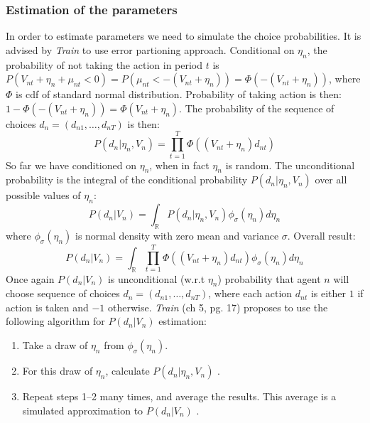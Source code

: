 \documentclass[11pt,a4paper]{article}
\begin{document}
\subsubsection*{Estimation of the parameters}
In order to estimate parameters we need to simulate the choice
probabilities. It is advised by \textit{Train} to use error
partioning approach. Conditional on $ \eta_n $, the probability
of not taking the action in period $ t $ is
$ P(V_{nt} + \eta_n + \mu_{nt} < 0) = P(\mu_{nt} < -(V_{nt} + \eta_n )) =
    \Phi(-(V_{nt} + \eta_n))$, where $ \Phi $ is cdf of standard normal
distribution. Probability of taking action is then:
$1 - \Phi(-(V_{nt} + \eta_n)) = \Phi(V_{nt} + \eta_n)$.
The probability of the sequence of choices $ d_n = (d_{n1}, \dots, d_{nT}) $
is then:
$$
    P(d_n |\eta_n, V_n) = \prod_{t=1}^{T}\Phi((V_{nt} + \eta_n)d_{nt})
$$
So far we have conditioned on $ \eta_n $, when in fact $ \eta_n $
is random. The unconditional probability is the integral of the
conditional probability $ P(d_n |\eta_n, V_n) $ over all possible
values of $ \eta_n $:
$$ P(d_n | V_n) = \int_{\mathbb{R}}  P(d_n |\eta_n, V_n) \phi_\sigma(\eta_n)d\eta_n$$
where $ \phi_\sigma (\eta_n) $ is normal density with zero mean and
variance $ \sigma $. Overall result:
$$
    P(d_n| V_n) = \int_{\mathbb{R}}  \prod_{t=1}^{T}\Phi((V_{nt} + \eta_n)d_{nt}) \phi_\sigma(\eta_n)d\eta_n
$$
Once again $ P(d_n| V_n) $ is unconditional (w.r.t $\eta_n$) probability that agent
$ n $ will choose sequence of choices $ d_n = (d_{n1}, \dots, d_{nT}) $,
where each action $ d_{nt} $ is either $ 1 $ if action is taken and
$-1$ otherwise. \textit{Train} (ch 5, pg. 17) proposes to use the
following algorithm for $ P(d_n| V_n) $ estimation:
\begin{enumerate}[itemsep=0em]
    \item Take a draw of $\eta_n$ from $\phi_{\sigma}(\eta_n)$.
    \item For this draw of $ \eta_n $, calculate $ P(d_n |\eta_n, V_n) $ .
    \item Repeat steps 1–2 many times, and average the results.
          This average is a simulated approximation to $ P(d_n| V_n) $ .
\end{enumerate}
\end{document}
